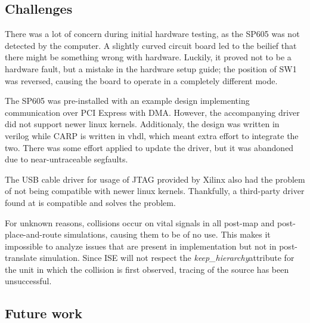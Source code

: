 
\subsection{Challenges}
\label{sec:challenges}


There was a lot of concern during initial hardware testing, as the SP605 was not detected by the computer.
A slightly curved circuit board led to the beilief that there might be something wrong with hardware.
Luckily, it proved not to be a hardware fault, but a mistake in the hardware setup guide; the position of SW1 was reversed, causing the board to operate in a completely different mode.

The SP605 was pre-installed with an example design implementing communication over PCI Express with DMA.
However, the accompanying driver did not support newer linux kernels.
Additionaly, the design was written in verilog while CARP is written in vhdl, which meant extra effort to integrate the two.
There was some effort applied to update the driver, but it was abandoned due to near-untraceable segfaults.

The USB cable driver for usage of JTAG provided by Xilinx also had the problem of not being compatible with newer linux kernels.
Thankfully, a third-party driver found at \cite{usbdriver} is compatible and solves the problem.

For unknown reasons, collisions occur on vital signals in all post-map and post-place-and-route simulations\footnotemark, causing them to be of no use.
This makes it impossible to analyze issues that are present in implementation but not in post-translate simulation.
Since ISE will not respect the \emph{keep\_hierarchy}\footnotemark attribute for the unit in which the collision is first observed, tracing of the source has been unsuccessful.

\subsection{Future work}

